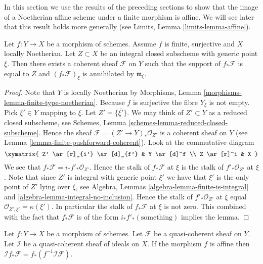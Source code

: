 \noindent
In this section we use the results of the preceding sections
to show that the image of a Noetherian affine scheme under a finite
morphism is affine. We will see later that this result holds more
generally (see Limits, Lemma \ref{limits-lemma-affine}).

\begin{lemma}
\label{lemma-finite-morphism-Noetherian}
Let $f : Y \to X$ be a morphism of schemes.
Assume $f$ is finite, surjective and $X$ locally Noetherian.
Let $Z \subset X$ be an integral closed subscheme with
generic point $\xi$. Then
there exists a coherent sheaf $\mathcal{F}$ on $Y$
such that the support of $f_*\mathcal{F}$ is equal to $Z$
and $(f_*\mathcal{F})_\xi$ is annihilated by $\mathfrak m_\xi$.
\end{lemma}

\begin{proof}
Note that $Y$ is locally Noetherian by
Morphisms, Lemma \ref{morphisms-lemma-finite-type-noetherian}.
Because $f$ is surjective the fibre $Y_\xi$ is not empty.
Pick $\xi' \in Y$ mapping to $\xi$. Let $Z' = \overline{\{\xi'\}}$.
We may think of $Z' \subset Y$ as a reduced closed subscheme,
see Schemes, Lemma \ref{schemes-lemma-reduced-closed-subscheme}.
Hence the sheaf $\mathcal{F} = (Z' \to Y)_*\mathcal{O}_{Z'}$
is a coherent sheaf on $Y$ (see
Lemma \ref{lemma-finite-pushforward-coherent}).
Look at the commutative diagram
$$
\xymatrix{
Z' \ar[r]_{i'} \ar[d]_{f'} &
Y \ar[d]^f \\
Z \ar[r]^i &
X
}
$$
We see that $f_*\mathcal{F} = i_*f'_*\mathcal{O}_{Z'}$.
Hence the stalk of $f_*\mathcal{F}$ at $\xi$ is the stalk
of $f'_*\mathcal{O}_{Z'}$ at $\xi$. Note that since $Z'$ is
integral with generic point $\xi'$ we have that
$\xi'$ is the only point of $Z'$ lying over $\xi$, see
Algebra, Lemmas \ref{algebra-lemma-finite-is-integral} and
\ref{algebra-lemma-integral-no-inclusion}.
Hence the stalk of $f'_*\mathcal{O}_{Z'}$ at $\xi$
equal $\mathcal{O}_{Z', \xi'} = \kappa(\xi')$. In particular
the stalk of $f_*\mathcal{F}$ at $\xi$ is not zero.
This combined with the fact that $f_*\mathcal{F}$ is
of the form $i_*f'_*(\text{something})$ implies the lemma.
\end{proof}

\begin{lemma}
\label{lemma-affine-morphism-projection-ideal}
Let $f : Y \to X$ be a morphism of schemes.
Let $\mathcal{F}$ be a quasi-coherent sheaf on $Y$.
Let $\mathcal{I}$ be a quasi-coherent sheaf of ideals on $X$.
If the morphism $f$ is affine then
$\mathcal{I}f_*\mathcal{F} = f_*(f^{-1}\mathcal{I}\mathcal{F})$.
\end{lemma}

